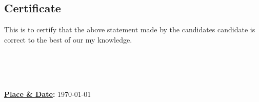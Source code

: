 \begin{minipage}{\textwidth}
    \begin{flushleft}
        {\let\clearpage\relax\chapter*{\centering \huge Certificate}}

        This is to certify that the above statement made by the \ifdefined\twoAuthor candidates \else candidate \fi is correct to the best of 
        \ifdefined\multipleadvisors our \else my \fi 
        knowledge.

        \vspace{0.4in}

        \begin{minipage}{0.45\textwidth}
            \begin{flushleft}
                
            
                \textbf{\advisorone}
                \textbf{
                    \ifx\advisortwo\empty\else      \\\advisortwo\fi 
                    \ifx\advisorthree\empty\else    \\\advisorthree\fi 
                    \ifx\advisorfour\empty\else     \\\advisorfour\fi   
                }
            \end{flushleft}
            
        \end{minipage}%
        \hfill
        \begin{minipage}{0.45\textwidth}
            \textbf{\underline{Place \& Date}:} \today
        \end{minipage}%
    \end{flushleft}
\end{minipage}